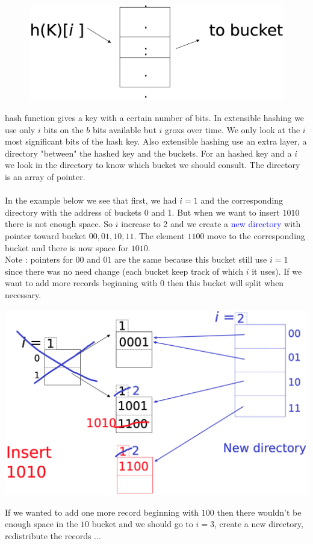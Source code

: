 \documentclass[12pt,a4paper]{article}
\begin{document}
\begin{figure}
\vspace{-5mm}
\includegraphics[scale=0.3]{img/img45.png}
\end{figure}
hash function gives a key with a certain number of bits. In extensible hashing we use only $i$ bits on the $b$ bits available but $i$ groxs over time. We only look at the $i$ most significant bits of the hash key. Also extensible hashing use an extra layer, a directory "between" the hashed key and the buckets. For an hashed key and a $i$ we look in the directory to know which bucket we should consult. The directory is an array of pointer.\\
\\
In the example below we see that first, we had $i=1$ and the corresponding directory with the address of buckets 0 and 1. But when we want to insert $1010$ there is not enough space. So $i$ increase to 2 and we create a \textcolor{blue}{new directory} with pointer toward bucket $00,01,10,11$. The element $1100$ move to the corresponding bucket and there is now space for $1010$.\\ 
Note : pointers for $00$ and $01$ are the same because this bucket still use $i=1$ since there was no need change (each bucket keep track of which $i$ it uses). If we want to add more records beginning with 0 then this bucket will split when necessary.
\begin{center}
\includegraphics[scale=0.3]{img/img46.png}
\end{center}
If we wanted to add one more record beginning with $100$ then there wouldn't be enough space in the $10$ bucket and we should go to $i=3$, create a new directory, redistribute the records ...\\
\\
\end{document}
